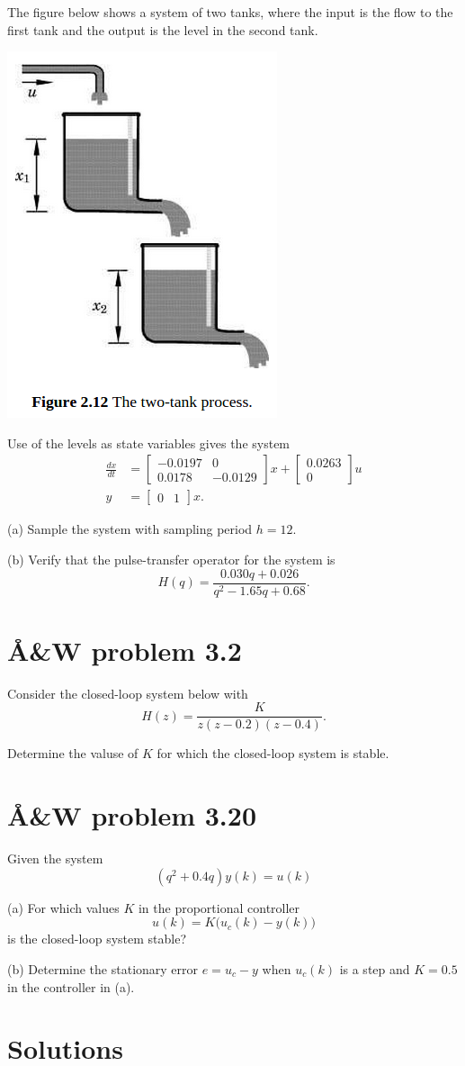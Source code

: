 \documentclass{scrartcl}
\newcommand*{\bbm}{\begin{bmatrix}}
\newcommand*{\ebm}{\end{bmatrix}}
\begin{document}
The figure below shows a system of two tanks, where the input is the flow to the first tank and the output is the level in the second tank.
\begin{center}
\includegraphics[width=0.2\linewidth]{tanks.png}
\end{center}
Use of the levels as state variables gives the system
\begin{align*}
\frac{dx}{dt} &= \bbm -0.0197 & 0\\0.0178 & -0.0129 \ebm x + \bbm 0.0263\\0 \ebm u\\
y &= \bbm 0 & 1\ebm x.
\end{align*}

(a) Sample the system with sampling period $h=12$.

(b) Verify that the pulse-transfer operator for the system is
\[ H(q) = \frac{0.030q + 0.026}{q^2 -1.65q + 0.68}. \]
\section*{Å\&W problem 3.2}
\label{sec-4}

Consider the closed-loop system below with
\[ H(z) = \frac{K}{z(z-0.2)(z-0.4)}. \]
\begin{center}

\end{center}

Determine the valuse of $K$ for which the closed-loop system is stable.
\section*{Å\&W problem 3.20}
\label{sec-5}


Given the system
\[ (q^2 + 0.4q)y(k) = u(k) \]

(a) For which values $K$ in the proportional controller 
\[ u(k) = K\big(u_c(k) - y(k)\big) \]
is the closed-loop system stable?

(b) Determine the stationary error $e = u_c-y$ when $u_c(k)$ is a step and $K=0.5$ in the controller in (a).
\section*{Solutions}
\label{sec-6}
\end{document}
